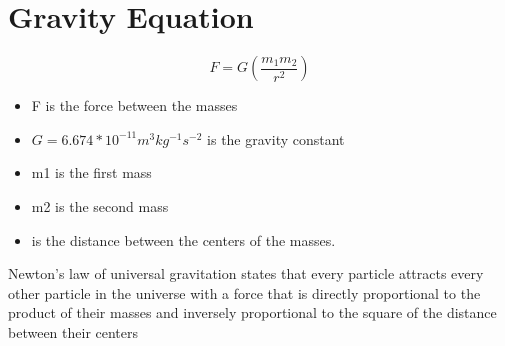 

\section{Gravity Equation}
\begin{flushleft}
\[ 
F = G \left( \frac{m_1 m_2}{r^2} \right)
\]
\begin{itemize}
  \item F is the force between the masses
  \item $G=6.674*10 ^{-11}  m^{3}kg^{-1}s^{-2}$ is the gravity constant
  \item m1 is the first mass
  \item m2 is the second mass
  \item is the distance between the centers of the masses.
\end{itemize}


\setlength{\parindent}{2ex}
Newton's law of universal gravitation states that every particle attracts every other particle in the universe with a force that is directly proportional to the product of their masses and inversely proportional to the square of the distance between their centers

\end{flushleft}


